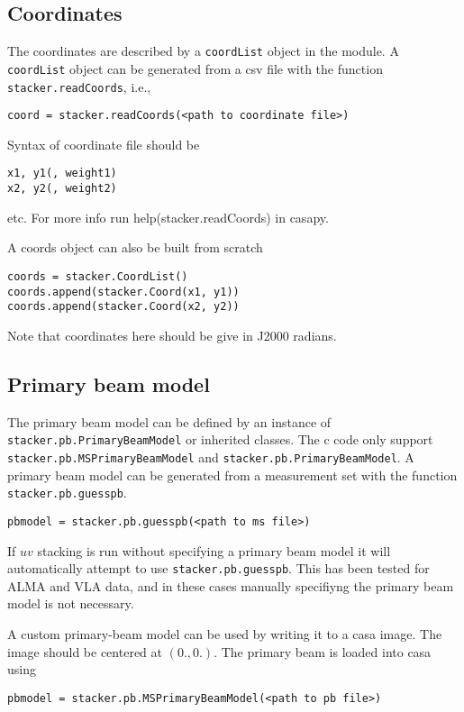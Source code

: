 \documentclass{article}
\begin{document}
\subsection{Coordinates}
The coordinates are described by a {\tt coordList} object in the module.
A {\tt coordList} object can be generated from a csv file with the function {\tt stacker.readCoords},
i.e.,
\begin{verbatim}
coord = stacker.readCoords(<path to coordinate file>)
\end{verbatim}
Syntax of coordinate file should be
\begin{verbatim}
x1, y1(, weight1)
x2, y2(, weight2)
\end{verbatim}
etc. For more info run help(stacker.readCoords) in casapy.


A coords object can also be built from scratch
\begin{verbatim}
coords = stacker.CoordList()
coords.append(stacker.Coord(x1, y1))
coords.append(stacker.Coord(x2, y2))
\end{verbatim}
Note that coordinates here should be give in J2000 radians.

\subsection{Primary beam model}
\label{sec:pb}
The primary beam model can be defined by an instance of 
{\tt stacker.pb.PrimaryBeamModel} or inherited classes. The c code only support
{\tt stacker.pb.MSPrimaryBeamModel} and {\tt stacker.pb.PrimaryBeamModel}. 
A primary beam model can be generated from a measurement set with the function
{\tt stacker.pb.guesspb}.
\begin{verbatim}
pbmodel = stacker.pb.guesspb(<path to ms file>)
\end{verbatim}
If $uv$ stacking is run without specifying a primary beam model it will automatically attempt to use {\tt stacker.pb.guesspb}.
This has been tested for ALMA and VLA data, 
and in these cases manually specifiyng the primary beam model is not necessary.

A custom primary-beam model can be used by writing it to a casa image.
The image should be centered at $(0., 0.)$.
The primary beam is loaded into casa using
\begin{verbatim}
pbmodel = stacker.pb.MSPrimaryBeamModel(<path to pb file>)
\end{verbatim}
\end{document}
